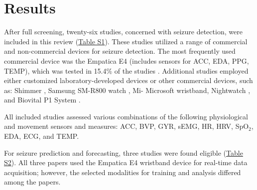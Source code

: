 \section{Results}

After full screening, twenty-six studies, concerned with seizure detection, were included in this review (\href{https://docs.google.com/spreadsheets/d/1FjxwkHFbNDM84nuqg513gR_0vIVql-evoT1EMiqSYZU/edit?pli=1&gid=1255223968#gid=1255223968}{Table S1}). These studies utilized a range of commercial and non-commercial devices for seizure detection. The most frequently used commercial device was the Empatica E4 (includes sensors for ACC, EDA, PPG, TEMP), which was tested in 15.4\% of the studies \cite{Yu2023-ss, Regalia2019-ch,Nasseri2021-xn, Tang2021-td}. Additional studies employed either customized laboratory-developed devices or other commercial devices, such as: Shimmer \cite{Van_Andel2017-yx, Gheryani2017-yg}, Samsung SM-R800 watch \cite{Vakilna2024-hk}, Mi- Microsoft wristband\cite{Jiang2022-zu}, Nightwatch \cite{Arends2018-ew}, and Biovital P1 System \cite{Wu2024-yl, Wang2025-ql}.

All included studies assessed various combinations of the following physiological and movement sensors and measures: ACC, BVP, GYR, sEMG, HR, HRV, SpO$_2$, EDA, ECG, and TEMP.

For seizure prediction and forecasting, three studies were found eligible \cite{Vieluf2023-ta,Vieluf2023-zv,Meisel2020-ii} (\href{https://docs.google.com/spreadsheets/d/1FjxwkHFbNDM84nuqg513gR_0vIVql-evoT1EMiqSYZU/edit?pli=1&gid=97270185#gid=97270185}{Table S2}). All three papers used the Empatica E4 wristband device for real-time data acquisition; however, the selected modalities for training and analysis differed among the papers.







